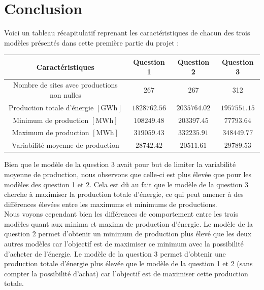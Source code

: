\documentclass{article}
\begin{document}
\section*{Conclusion}
Voici un tableau récapitulatif reprenant les caractéristiques de chacun des trois modèles présentés dans cette première partie du projet :
\begin{center}
    \begin{tabular}{c| c c c }
        Caractéristiques & Question 1 & Question 2 & Question 3\\
        \hline
        Nombre de sites avec productions non nulles & 267 & 267 & 312\\
        Production totale d'énergie $[\mathrm{GWh}]$& $1828762.56$ & $2035764.02$ & $1957551.15$\\
        Minimum de production $[\mathrm{MWh}]$ & $108249.48$ & $203397.45$ & $77793.64$\\
        Maximum de production $[\mathrm{MWh}]$ & $319059.43$ & $332235.91$ & $348449.77$\\
        Variabilité moyenne de production & $28742.42$ & $20511.61$ & $29789.53$\\
        \hline
    \end{tabular}
\end{center}

\medskip
Bien que le modèle de la question 3 avait pour but de limiter la variabilité moyenne de production, nous observons que celle-ci est plus élevée que pour les modèles des question 1 et 2. Cela est dû au fait que le modèle de la question 3 cherche à maximiser la production totale d'énergie, ce qui peut amener à des différences élevées entre les maximums et minimums de productions.\\
Nous voyons cependant bien les différences de comportement entre les trois modèles quant aux minima et maxima de production d'énergie. Le modèle de la question 2 permet d'obtenir un minimum de production plus élevé que les deux autres modèles  car l'objectif est de maximiser ce minimum avec la possibilité d'acheter de l'énergie. Le modèle de la question 3 permet d'obtenir une production totale d'énergie plus élevée que le modèle de la question 1 et 2 (sans compter la possibilité d'achat) car l'objectif est de maximiser cette production totale.\\
\end{document}
